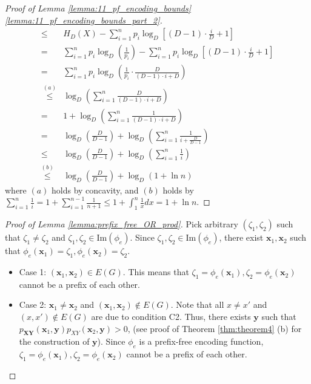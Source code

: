 \documentclass[journal, onecolumn, draftcls]{IEEEtran}
\theoremstyle{definition}
\newcommand{\bfy}{\mathbf{y}}
\newcommand{\bfX}{\mathbf{X}}
\newcommand{\bfY}{\mathbf{Y}}
\newcommand{\bfx}{\mathbf{x}}
\newcommand{\meng}[1]{\marginpar{+}{\bf Ruoyu's remark}: {\em #1}}
\newcommand{\aditya}[1]{\marginpar{+}{\bf Aditya's remark}: {\em #1}}
\begin{document}
\begin{proof}[Proof of Lemma \ref{lemma:11_pf_encoding_bounds}  \ref{lemma:11_pf_encoding_bounds_part_2}]
\begin{align*}
        \le&H_D(X) - \sum_{i=1}^n p_i {\log_D[(D-1)\cdot \frac{i}{D}+1]}\\
        =& \sum_{i=1}^n p_i\log_D\left(\frac{1}{p_i}\right) - \sum_{i=1}^n p_i {\log_D[(D-1)\cdot \frac{i}{D}+1]}\\
        =& \sum_{i=1}^n p_i\log_D\left(\frac{1}{p_i}\cdot \frac{D}{(D-1)\cdot i + D}\right)\\
        \
        \overset{(a)}{\le }&   \log_D \left(\sum_{i=1}^n \frac{D}{(D-1)\cdot i + D}\right)\\
        =&  1+  \log_D \left(\sum_{i=1}^n \frac{1}{(D-1)\cdot i + D} \right)\\ 
        =&   \log_D\left(\frac{D}{D-1}\right) +\log_D \left(\sum_{i=1}^n \frac{1}{ i + \frac{D}{D-1}}\right)\\ 
        \le &   \log_D\left(\frac{D}{D-1}\right) +\log_D \left(\sum_{i=1}^n \frac{1}{ i } \right)\\ 
        \overset{(b)}{\le} &   \log_D\left(\frac{D}{D-1}\right) +\log_D(1+\ln n)
    \end{align*}
    where $(a)$ holds by concavity, and $(b)$ holds by $\sum_{i=1}^n \frac{1}{ i }=1+\sum_{i=1}^{n-1}\frac{1}{n+1}\le1+\int_{1}^n\frac{1}{x}dx=1+\ln n $.
\end{proof}
\begin{proof}[Proof of Lemma \ref{lemma:prefix_free_OR_prod}]
Pick arbitrary $(\zeta_1,\zeta_2)$   such that  $\zeta_1\ne \zeta_2$ and $\zeta_1,\zeta_2\in \text{Im}(\phi_e)$. Since $\zeta_1,\zeta_2\in \text{Im}(\phi_e)$, there exist $\bfx_1,\bfx_2$ such that $\phi_e(\bfx_1)=\zeta_1,\phi_e(\bfx_2)=\zeta_2$. 
\begin{itemize} 

    \item Case 1: $(\bfx_1,\bfx_2)\in E(G)$. This means that  $\zeta_1=\phi_e(\bfx_1),\zeta_2=\phi_e(\bfx_2)$ cannot be a prefix of each other. 


    \item Case 2:  $\bfx_1\ne\bfx_2$ and $(\bfx_1,\bfx_2)\notin E(G)$. Note that all $x\ne x'$ and $(x,x')\notin E(G)$ are due to condition C2. Thus, there exists $\bfy$ such that $p_{\bfX\bfY}(\bfx_1,\bfy)p_{XY}(\bfx_2,\bfy)>0$, (see proof of Theorem \ref{thm:theorem4} (b) for the construction of $\bfy$). Since $\phi_e$ is a prefix-free encoding function,  $\zeta_1=\phi_e(\bfx_1),\zeta_2=\phi_e(\bfx_2)$ cannot be a prefix of each other. %
\end{itemize}
\end{proof}
\end{document}
